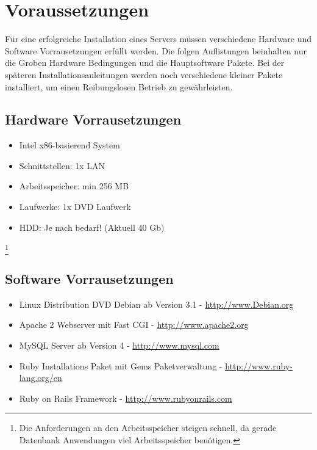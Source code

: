 \chapter{Voraussetzungen }  %
\label{chapter:Vorausetzungen}  %

Für eine erfolgreiche Installation eines Servers müssen verschiedene Hardware und Software Vorrausetzungen erfüllt werden. Die folgen Auflistungen beinhalten nur die Groben Hardware Bedingungen und die Hauptsoftware Pakete. Bei der späteren Installationsanleitungen werden noch verschiedene kleiner Pakete installiert, um einen Reibungslosen Betrieb zu gewährleisten. \\
\section{Hardware Vorrausetzungen}
\label{section:Hardware Vorraussetzungen}
\begin{itemize}
\item Intel x86-basierend System 
\item Schnittstellen: 1x LAN
\item Arbeitsspeicher: min 256 MB \footnotemark[1]
\item Laufwerke: 1x DVD Laufwerk
\item HDD: Je nach bedarf! (Aktuell 40 Gb)
\end{itemize}
\footnote[1]{Die Anforderungen an den Arbeitsspeicher steigen schnell, da gerade Datenbank Anwendungen viel Arbeitsspeicher benötigen.}

\section{Software Vorrausetzungen}
\label{section:Software Vorraussetzungen}
\begin{itemize}
\item Linux Distribution DVD Debian ab Version 3.1 - \href{http://www.Debian.org}{http://www.Debian.org}
\item Apache 2 Webserver mit Fast CGI -
\href{http://www.apache2.org}{http://www.apache2.org}
\item MySQL Server ab Version 4 - 
\href{http://dev.mysql.com}{http://www.mysql.com}
\item Ruby Installations Paket mit Gems Paketverwaltung - \href{http://www.ruby-lang.org/en/}{http://www.ruby-lang.org/en}
\item Ruby on Rails Framework -
\href{http://www.rubyonrails.com/}{http://www.rubyonrails.com}
\end{itemize}
